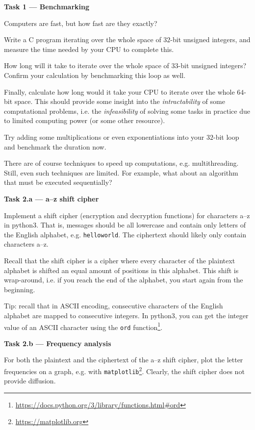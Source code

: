 \documentclass{practice}
\begin{document}
\textbf{Task 1 --- Benchmarking}

Computers are fast, but how fast are they exactly?

Write a C program iterating over the whole space of $32$-bit unsigned integers, and measure the time needed by your CPU to complete this.

How long will it take to iterate over the whole space of $33$-bit unsigned integers?
Confirm your calculation by benchmarking this loop as well.

Finally, calculate how long would it take your CPU to iterate over the whole $64$-bit space.
This should provide some insight into the \textit{intractability} of some computational problems, i.e. the \textit{infeasibility} of solving some tasks in practice due to limited computing power (or some other resource).

Try adding some multiplications or even exponentiations into your $32$-bit loop and benchmark the duration now.

There are of course techniques to speed up computations, e.g. multithreading.
Still, even such techniques are limited.
For example, what about an algorithm that must be executed sequentially?

\textbf{Task 2.a --- a--z shift cipher}

Implement a shift cipher (encryption and decryption functions) for characters a--z in python3.
That is, messages should be all lowercase and contain only letters of the English alphabet, e.g. \texttt{helloworld}.
The ciphertext should likely only contain characters a--z.

Recall that the shift cipher is a cipher where every character of the plaintext alphabet is shifted an equal amount of positions in this alphabet.
This shift is wrap-around, i.e. if you reach the end of the alphabet, you start again from the beginning.

Tip:
recall that in ASCII encoding, consecutive characters of the English alphabet are mapped to consecutive integers.
In python3, you can get the integer value of an ASCII character using the \texttt{ord} function\footnote{\url{https://docs.python.org/3/library/functions.html\#ord}}.

\textbf{Task 2.b --- Frequency analysis}

For both the plaintext and the ciphertext of the a--z shift cipher, plot the letter frequencies on a graph, e.g. with \texttt{matplotlib}\footnote{\url{https://matplotlib.org}}.
Clearly, the shift cipher does not provide diffusion.
\end{document}
